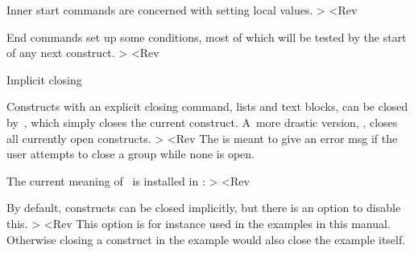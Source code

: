 Inner start commands are concerned with setting local values.
\Ver>
\def\inner@start@commands{%
    \nxp\Open@Group\CSname{\@class}\CSname{\@name}%
The \cs{Open@Group} call makes it possible to track down groups
that have inadvertendly been left open. Since we now know the
name we can give helpful error msgs.
\Ver>
    \install@stop<Rev
Install the right implicit closing, see~\ref[sec:implicit:close]
and~\ref[imp:implicit:close].
\Ver>
    \ifleft@embedded@construct
    \else \nxp\hold@parskip 
        \nxp\@defaulteverypar
        \ifwhiteleft@defined \advance\leftskip \the\@whiteleft \relax \fi
        \ifwhiteright@defined \advance\rightskip \the\@whiteright \relax \fi
        \nxp\let\nxp\par=\nxp\@par %
        \inside@indent \first@indent
    \fi
    \advance\nest@depth\@ne<Rev
The nest depth is used for determining indentation levels.
\Ver>
    }<Rev

End commands set up some conditions, most of which will be tested
by the start of any next construct.
\Ver>
\def\inner@end@commands{%
    \nxp\Close@Group\CSname{\@class}\CSname{\@name}%
    \ifright@embedded@construct \else \nxp\leavehmode \fi
    \@afterpenalty
    \ifright@embedded@construct \else \nxp\@vwhite{\the\@whiteafter}\fi
    }
\def\outer@end@commands{%
    \the\after@toks
    \ifright@embedded@construct 
        \nxp\@headedno \nxp\esp@hack
    \else
        \after@indent \nxp\dono@parskip
    \fi}<Rev

 Implicit closing

Constructs with an explicit closing command, lists and text blocks,
can be closed by~\cs{>}, which simply closes the current
construct. A~more drastic version, \cs{>]}, closes all currently
open constructs.
\Ver>
\def\outer@stop@command{\Emessage{Vacuous group closing}}
\let\default@stop@command\outer@stop@command
\def\>{\default@stop@command%
    \ifNextChar]{%
        \ifx\default@stop@command\outer@stop@command
            \xp\take@one
        \else \xp\>\fi}{}}<Rev
The  is meant to give an error msg if the
user attempts to close a group while none is open.

The current meaning of~\cs{>} is installed in
:
\Ver>
\def\install@stop{\if@implicitclose
        \def\nxp\default@stop@command
               {\CSname{\stop@command}}%
    \else \let\nxp\default@stop@command
              \nxp\outer@stop@command 
    \fi}<Rev

By default, constructs can be closed implicitly, but there is an
option  to disable this.
\Ver>
\newif\if@implicitclose
\add@generic@default{\@implicitcloseyes}
<Rev
This option is for instance used in the examples in this manual.
Otherwise closing a construct in the example would also close the
example itself.

\ImpNoteStop
